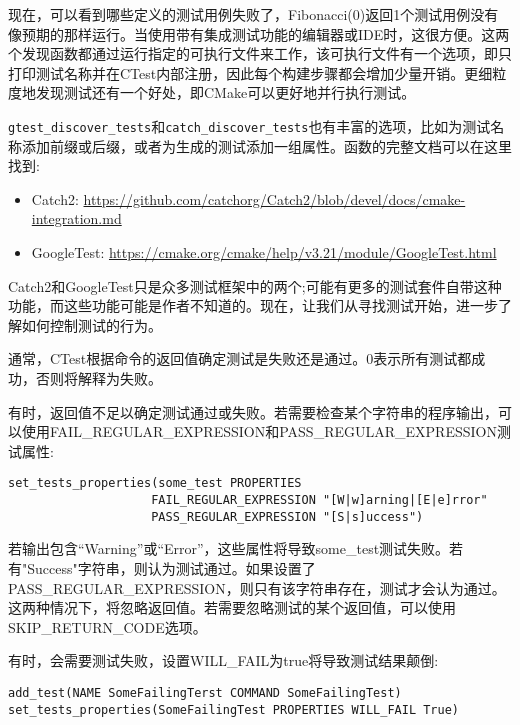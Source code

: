 现在，可以看到哪些定义的测试用例失败了，Fibonacci(0)返回1个测试用例没有像预期的那样运行。当使用带有集成测试功能的编辑器或IDE时，这很方便。这两个发现函数都通过运行指定的可执行文件来工作，该可执行文件有一个选项，即只打印测试名称并在CTest内部注册，因此每个构建步骤都会增加少量开销。更细粒度地发现测试还有一个好处，即CMake可以更好地并行执行测试。

\texttt{gtest\_discover\_tests}和\texttt{catch\_discover\_tests}也有丰富的选项，比如为测试名称添加前缀或后缀，或者为生成的测试添加一组属性。函数的完整文档可以在这里找到:

\begin{itemize}
\item 
Catch2: \url{https://github.com/catchorg/Catch2/blob/devel/docs/cmake-integration.md}
	
\item 
GoogleTest: \url{https://cmake.org/cmake/help/v3.21/module/GoogleTest.html}
\end{itemize}

Catch2和GoogleTest只是众多测试框架中的两个;可能有更多的测试套件自带这种功能，而这些功能可能是作者不知道的。现在，让我们从寻找测试开始，进一步了解如何控制测试的行为。

 
通常，CTest根据命令的返回值确定测试是失败还是通过。0表示所有测试都成功，否则将解释为失败。

有时，返回值不足以确定测试通过或失败。若需要检查某个字符串的程序输出，可以使用FAIL\_REGULAR\_EXPRESSION和PASS\_REGULAR\_EXPRESSION测试属性:

\begin{lstlisting}[style=styleCMake]
set_tests_properties(some_test PROPERTIES
					FAIL_REGULAR_EXPRESSION "[W|w]arning|[E|e]rror"
					PASS_REGULAR_EXPRESSION "[S|s]uccess")
\end{lstlisting}

若输出包含“Warning”或“Error”，这些属性将导致some\_test测试失败。若有"Success"字符串，则认为测试通过。如果设置了PASS\_REGULAR\_EXPRESSION，则只有该字符串存在，测试才会认为通过。这两种情况下，将忽略返回值。若需要忽略测试的某个返回值，可以使用SKIP\_RETURN\_CODE选项。

有时，会需要测试失败，设置WILL\_FAIL为true将导致测试结果颠倒:

\begin{lstlisting}[style=styleCMake]
add_test(NAME SomeFailingTerst COMMAND SomeFailingTest)
set_tests_properties(SomeFailingTest PROPERTIES WILL_FAIL True)
\end{lstlisting}

